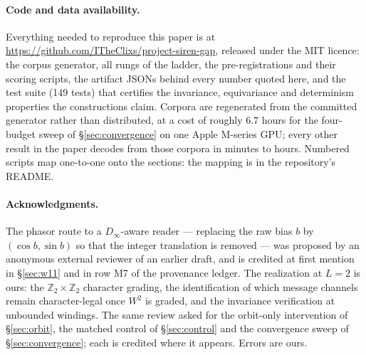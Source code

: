 \documentclass[10pt,letterpaper]{article}
\theoremstyle{definition}
\newcommand{\Z}{\mathbb{Z}}
\newcommand{\Dinf}{D_\infty}
\begin{document}
\paragraph{Code and data availability.} Everything needed to reproduce this paper is at
\url{https://github.com/ITheClixs/project-siren-gap}, released under the MIT licence: the corpus
generator, all rungs of the ladder, the pre-registrations and their scoring scripts, the artifact
JSONs behind every number quoted here, and the test suite (149 tests) that certifies the
invariance, equivariance and determinism properties the constructions claim. Corpora are
regenerated from the committed generator rather than distributed, at a cost of roughly $6.7$ hours
for the four-budget sweep of \S\ref{sec:convergence} on one Apple M-series GPU; every other result
in the paper decodes from those corpora in minutes to hours. Numbered scripts map one-to-one onto
the sections: the mapping is in the repository's README.

\paragraph{Acknowledgments.} The phasor route to a $\Dinf$-aware reader --- replacing the raw bias
$b$ by $(\cos b, \sin b)$ so that the integer translation is removed --- was proposed by an
anonymous external reviewer of an earlier draft, and is credited at first mention in
\S\ref{sec:w11} and in row M7 of the provenance ledger. The realization at $L=2$ is ours: the
$\Z_2\times\Z_2$ character grading, the identification of which message channels remain
character-legal once $W^2$ is graded, and the invariance verification at unbounded windings. The
same review asked for the orbit-only intervention of \S\ref{sec:orbit}, the matched control of
\S\ref{sec:control} and the convergence sweep of \S\ref{sec:convergence}; each is credited where it
appears. Errors are ours.
\end{document}
